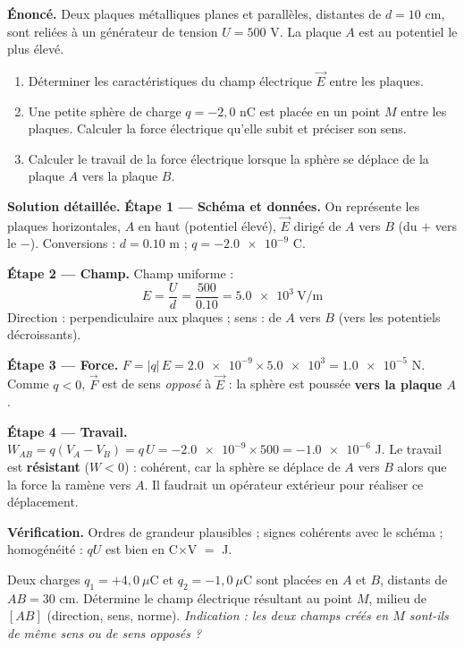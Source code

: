 \documentclass[11pt]{article}
\begin{document}
\begin{exoresolu}
\textbf{Énoncé.} Deux plaques métalliques planes et parallèles, distantes de $d = 10$ cm, sont reliées à un générateur de tension $U = 500$ V. La plaque $A$ est au potentiel le plus élevé.
\begin{enumerate}
\item Déterminer les caractéristiques du champ électrique $\vec{E}$ entre les plaques.
\item Une petite sphère de charge $q = -2{,}0$ nC est placée en un point $M$ entre les plaques. Calculer la force électrique qu'elle subit et préciser son sens.
\item Calculer le travail de la force électrique lorsque la sphère se déplace de la plaque $A$ vers la plaque $B$.
\end{enumerate}
\tcblower
\textbf{Solution détaillée.}
\textbf{Étape 1 — Schéma et données.} On représente les plaques horizontales, $A$ en haut (potentiel élevé), $\vec{E}$ dirigé de $A$ vers $B$ (du $+$ vers le $-$). Conversions : $d = \num{0,10}$ m ; $q = \num{-2,0e-9}$ C.

\textbf{Étape 2 — Champ.} Champ uniforme :
\[ E = \frac{U}{d} = \frac{500}{\num{0,10}} = \num{5,0e3}\ \text{V/m} \]
Direction : perpendiculaire aux plaques ; sens : de $A$ vers $B$ (vers les potentiels décroissants).

\textbf{Étape 3 — Force.} $F = |q|\,E = \num{2,0e-9}\times\num{5,0e3} = \num{1,0e-5}$ N. Comme $q < 0$, $\vec{F}$ est de sens \emph{opposé} à $\vec{E}$ : la sphère est poussée \textbf{vers la plaque $A$}.

\textbf{Étape 4 — Travail.} $W_{AB} = q(V_A - V_B) = q\,U = \num{-2,0e-9}\times 500 = \num{-1,0e-6}$ J.
Le travail est \textbf{résistant} ($W < 0$) : cohérent, car la sphère se déplace de $A$ vers $B$ alors que la force la ramène vers $A$. Il faudrait un opérateur extérieur pour réaliser ce déplacement.

\textbf{Vérification.} Ordres de grandeur plausibles ; signes cohérents avec le schéma ; homogénéité : $qU$ est bien en C$\times$V $=$ J.
\end{exoresolu}

\begin{exercice}
Deux charges $q_1 = +4{,}0\ \mu$C et $q_2 = -1{,}0\ \mu$C sont placées en $A$ et $B$, distants de $AB = 30$ cm. Détermine le champ électrique résultant au point $M$, milieu de $[AB]$ (direction, sens, norme). \emph{Indication : les deux champs créés en $M$ sont-ils de même sens ou de sens opposés ?}
\end{exercice}
\end{document}
